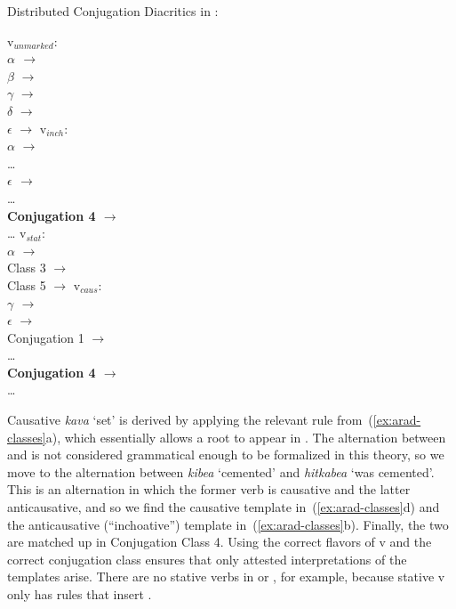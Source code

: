 \pex Distributed Conjugation Diacritics in \cite{arad05}: \label{ex:arad-classes}
\begin{multicols}{2}
	\a  v$_{unmarked}$:\\
			\textbf{$\alpha$ $\rightarrow$ {\tkal}}\\
			$\beta$ $\rightarrow$ {\tnif}\\
			$\gamma$ $\rightarrow$ {\tpie}\\
			$\delta$ $\rightarrow$ {\thif}\\
			$\epsilon$ $\rightarrow$ {\thit}
	\a v$_{inch}$:\\
			$\alpha$ $\rightarrow$ {\tkal}\\
			\dots \\
			\textbf{$\epsilon$ $\rightarrow$ {\thit}}\\
			\dots \\
			\textbf{Conjugation 4 $\rightarrow$ {\thit}}\\
			\dots
		\columnbreak
	\a v$_{stat}$:\\
			$\alpha$ $\rightarrow$ {\tkal}\\
			Class 3 $\rightarrow$ {\tkal}\\
			Class 5 $\rightarrow$ {\tkal}
	\a v$_{caus}$:\\
			\textbf{$\gamma$ $\rightarrow$ {\tpie}}\\
			$\epsilon$ $\rightarrow$ {\thif}\\
			Conjugation 1 $\rightarrow$ {\tkal}\\
			\dots \\
			\textbf{Conjugation 4 $\rightarrow$ {\tpie}}\\
			\dots
	\end{multicols}
\xe

Causative \emph{kava} `set' is derived by applying the relevant rule from~(\ref{ex:arad-classes}a), which essentially allows a root to appear in {\tkal}. The alternation between {\tkal} and {\tpie} is not considered grammatical enough to be formalized in this theory, so we move to the alternation between \emph{kibea} `cemented' and \emph{hitkabea} `was cemented'. This is an alternation in which the former verb is causative and the latter anticausative, and so we find the causative template in~(\ref{ex:arad-classes}d) and the anticausative (``inchoative'') template in~(\ref{ex:arad-classes}b). Finally, the two are matched up in Conjugation Class 4. Using the correct flavors of v and the correct conjugation class ensures that only attested interpretations of the templates arise. There are no stative verbs in {\tpie} or {\thit}, for example, because stative v only has rules that insert {\tkal}. 

